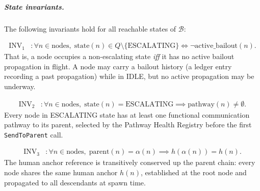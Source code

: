 
\subparagraph{State invariants.} The following invariants hold for all reachable states of $$:

\begin{align}
\text{INV}_1 &: \forall n \in \text{nodes},\; \text{state}(n) \in Q \setminus \{\text{ESCALATING}\} \iff \neg\text{active\_bailout}(n). \tag{INV-1}
\end{align}
That is, a node occupies a non-escalating state \emph{iff} it has no active bailout propagation in flight. A node may carry a bailout history (a ledger entry recording a past propagation) while in IDLE, but no active propagation may be underway.

\begin{align}
\text{INV}_2 &: \forall n \in \text{nodes},\; \text{state}(n) = \text{ESCALATING} \implies \text{pathway}(n) \neq \emptyset. \tag{INV-2}
\end{align}
Every node in ESCALATING state has at least one functional communication pathway to its parent, selected by the Pathway Health Registry before the first \texttt{SendToParent} call.

\begin{align}
\text{INV}_3 &: \forall n \in \text{nodes},\; \text{parent}(n) = \alpha(n) \implies h(\alpha(n)) = h(n). \tag{INV-3}
\end{align}
The human anchor reference is transitively conserved up the parent chain: every node shares the same human anchor $h(n)$, established at the root node and propagated to all descendants at spawn time.

